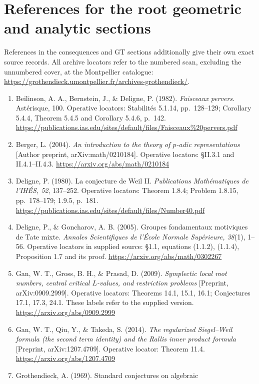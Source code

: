 \clearpage
\section{References for the root geometric and analytic sections}
References in the consequences and GT sections additionally give their
own exact source records. All archive locators refer to the numbered
scan, excluding the unnumbered cover, at the Montpellier catalogue:
\url{https://grothendieck.umontpellier.fr/archives-grothendieck/}.
\begin{enumerate}[leftmargin=*,label={}]
\item Beilinson, A. A., Bernstein, J., \& Deligne, P. (1982).
\emph{Faisceaux pervers}. Ast\'erisque, 100. Operative locators:
Stabilit\'es 5.1.14, pp.~128--129; Corollary 5.4.4,
Theorem 5.4.5 and Corollary 5.4.6, p.~142.
\url{https://publications.ias.edu/sites/default/files/Faisceaux%20pervers.pdf}
\item Berger, L. (2004). \emph{An introduction to the theory of
$p$-adic representations} [Author preprint, arXiv:math/0210184].
Operative locators: \S II.3.1 and II.4.1--II.4.3.
\url{https://arxiv.org/abs/math/0210184}
\item Deligne, P. (1980). La conjecture de Weil II.
\emph{Publications Math\'ematiques de l'IH\'ES, 52}, 137--252.
Operative locators: Theorem 1.8.4; Problem 1.8.15,
pp.~178--179; 1.9.5, p.~181.
\url{https://publications.ias.edu/sites/default/files/Number40.pdf}
\item Deligne, P., \& Goncharov, A. B. (2005). Groupes fondamentaux
motiviques de Tate mixte. \emph{Annales Scientifiques de l'\'Ecole
Normale Sup\'erieure, 38}(1), 1--56.
Operative locators in supplied source: \S1.1, equations
(1.1.2), (1.1.4), Proposition 1.7 and its proof.
\url{https://arxiv.org/abs/math/0302267}
\item Gan, W. T., Gross, B. H., \& Prasad, D. (2009).
\emph{Symplectic local root numbers, central critical $L$-values,
and restriction problems} [Preprint, arXiv:0909.2999].
Operative locators: Theorems 14.1, 15.1, 16.1;
Conjectures 17.1, 17.3, 24.1. These labels refer to the supplied version.
\url{https://arxiv.org/abs/0909.2999}
\item Gan, W. T., Qiu, Y., \& Takeda, S. (2014).
\emph{The regularized Siegel--Weil formula (the second term identity)
and the Rallis inner product formula} [Preprint, arXiv:1207.4709].
Operative locator: Theorem 11.4.
\url{https://arxiv.org/abs/1207.4709}
\item Grothendieck, A. (1969). Standard conjectures on algebraic

\end{enumerate}
